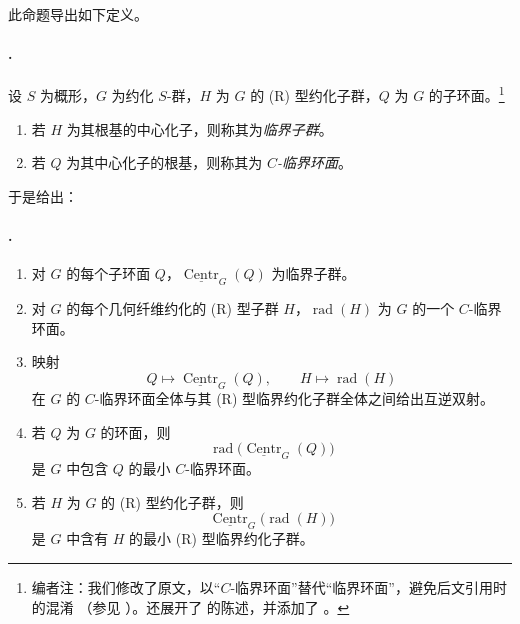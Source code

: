 此命题导出如下定义。

\paragraph{.}
设 \(S\) 为概形，\(G\) 为约化 \(S\)-群，\(H\) 为 \(G\) 的 \textup{(R)} 型约化子群，\(Q\) 为 \(G\) 的子环面。\footnote{编者注：我们修改了原文，以“\(C\)-临界环面”替代“临界环面”，避免后文引用时的混淆 \textup{（参见 ）}。还展开了  的陈述，并添加了 。}
\begin{enumerate}
\item[\textup{1)}] 若 \(H\) 为其根基的中心化子，则称其为\emph{临界子群}。
\item[\textup{2)}] 若 \(Q\) 为其中心化子的根基，则称其为 \emph{\(C\)-临界环面}。
\end{enumerate}

 于是给出：

\paragraph{.}
\begin{enumerate}
\item[\textup{(i)}] 对 \(G\) 的每个子环面 \(Q\)，\(\underline{\operatorname{Centr}}_G(Q)\) 为临界子群。

\item[\textup{(ii)}] 对 \(G\) 的每个几何纤维约化的 \textup{(R)} 型子群 \(H\)，\(\operatorname{rad}(H)\) 为 \(G\) 的一个 \(C\)-临界环面。

\item[\textup{(iii)}] 映射
\[
  Q\longmapsto\underline{\operatorname{Centr}}_G(Q),
  \qquad
  H\longmapsto\operatorname{rad}(H)
\]
在 \(G\) 的 \(C\)-临界环面全体与其 \textup{(R)} 型临界约化子群全体之间给出互逆双射。

\item[\textup{(iv)}] 若 \(Q\) 为 \(G\) 的环面，则
\[
  \operatorname{rad}\bigl(
    \underline{\operatorname{Centr}}_G(Q)\bigr)
\]
是 \(G\) 中包含 \(Q\) 的最小 \(C\)-临界环面。

\item[\textup{(v)}] 若 \(H\) 为 \(G\) 的 \textup{(R)} 型约化子群，则
\[
  \underline{\operatorname{Centr}}_G\bigl(\operatorname{rad}(H)\bigr)
\]
是 \(G\) 中含有 \(H\) 的最小 \textup{(R)} 型临界约化子群。
\end{enumerate}

